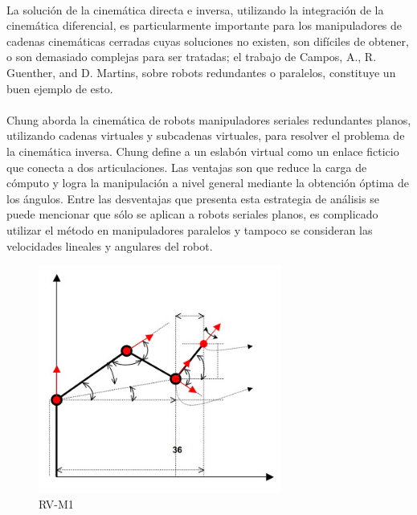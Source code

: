 \documentclass[letter,openright,12pt,spanish]{report}
\begin{document}
\\
La solución de la cinemática directa e inversa, utilizando la integración de la cinemática diferencial, es particularmente importante para los manipuladores de cadenas cinemáticas cerradas cuyas soluciones no existen, son difíciles de obtener, o son demasiado complejas para ser tratadas; el trabajo de Campos, A., R. Guenther, and D. Martins, sobre robots redundantes o paralelos, constituye un buen ejemplo de esto.\\
\\
Chung aborda la cinemática de robots manipuladores seriales redundantes planos, utilizando cadenas virtuales y subcadenas virtuales, para resolver el problema de la cinemática inversa. Chung define a un eslabón virtual como un enlace ficticio que conecta a dos articulaciones. Las ventajas son que reduce la carga de cómputo y logra la manipulación a nivel general mediante la obtención óptima de los ángulos. Entre las desventajas que presenta esta estrategia de análisis se puede mencionar que sólo se aplican a robots seriales planos, es complicado utilizar el método en manipuladores paralelos y tampoco se consideran las velocidades lineales y angulares del robot.

\begin{figure}[htp]
\centering
\includegraphics[width=8cm]{1.jpg}
\caption{RV-M1}
\label{Figura 1}
\end{figure}
\end{document}
